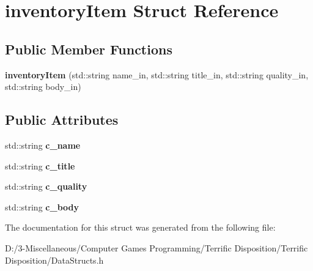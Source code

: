 \hypertarget{structinventory_item}{}\section{inventory\+Item Struct Reference}
\label{structinventory_item}
\subsection*{Public Member Functions}
\begin{DoxyCompactItemize}
\item 
\mbox{\label{structinventory_item_a2fffd264007e395b5ed2453c416ef0e3}} 
{\bfseries inventory\+Item} (std\+::string name\+\_\+in, std\+::string title\+\_\+in, std\+::string quality\+\_\+in, std\+::string body\+\_\+in)
\end{DoxyCompactItemize}
\subsection*{Public Attributes}
\begin{DoxyCompactItemize}
\item 
\mbox{\label{structinventory_item_a6d6f8dfceb7036e918fc221bc79f80a6}} 
std\+::string {\bfseries c\+\_\+name}
\item 
\mbox{\label{structinventory_item_aeb2bb0bfa7b8d59243d59316a40a2c52}} 
std\+::string {\bfseries c\+\_\+title}
\item 
\mbox{\label{structinventory_item_a42bfb6b3b5b4ff3e45c657c1809598d2}} 
std\+::string {\bfseries c\+\_\+quality}
\item 
\mbox{\label{structinventory_item_a73f2a8ccf6cea5d60d21f12cbbfc0424}} 
std\+::string {\bfseries c\+\_\+body}
\end{DoxyCompactItemize}


The documentation for this struct was generated from the following file\+:\begin{DoxyCompactItemize}
\item 
D\+:/3-\/\+Miscellaneous/\+Computer Games Programming/\+Terrific Disposition/\+Terrific Disposition/Data\+Structs.\+h\end{DoxyCompactItemize}
